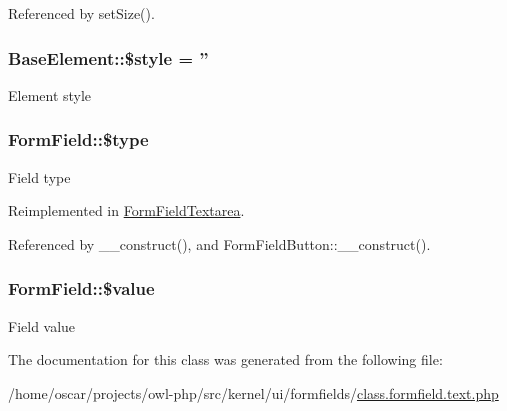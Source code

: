 Referenced by setSize().

\subsubsection[{\$style}]{\setlength{\rightskip}{0pt plus 5cm}BaseElement::\$style = ''}\label{classBaseElement_a429a3d642dd95f30e1059ef29564b87d}
Element style 
\subsubsection[{\$type}]{\setlength{\rightskip}{0pt plus 5cm}FormField::\$type}\label{classFormField_a37bed21a1891e95be0e4a697e45ba51b}
Field type 

Reimplemented in \hyperlink{classFormFieldTextarea_a85348034822c70694fc8640bfcacc04d}{FormFieldTextarea}.



Referenced by \_\-\_\-construct(), and FormFieldButton::\_\-\_\-construct().

\subsubsection[{\$value}]{\setlength{\rightskip}{0pt plus 5cm}FormField::\$value}\label{classFormField_a3c01e89834248eec8e2f145fbcfa0fbc}
Field value 

The documentation for this class was generated from the following file:\begin{DoxyCompactItemize}
\item 
/home/oscar/projects/owl-\/php/src/kernel/ui/formfields/\hyperlink{class_8formfield_8text_8php}{class.formfield.text.php}\end{DoxyCompactItemize}
